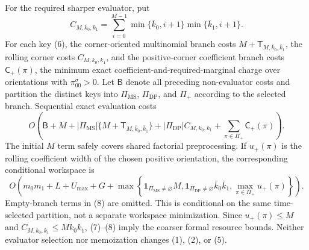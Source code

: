 For the required sharper evaluator, put
\[
C_{M,k_0,k_1}=\sum_{i=0}^{M-1}\min\{\bar k_0,i+1\}\min\{\bar k_1,i+1\}.
\]
For each key (6), the corner-oriented multinomial branch costs \(M+\mathsf T_{M,\bar k_0,\bar k_1}\), the rolling corner costs \(C_{M,k_0,k_1}\), and the positive-corner coefficient branch costs \(\mathsf C_+(\pi)\), the minimum exact coefficient-and-required-marginal charge over orientations with \(\pi^\sigma_{00}>0\). Let \(\mathsf B\) denote all preceding non-evaluator costs and partition the distinct keys into \(\Pi_{\mathrm{MS}}\), \(\Pi_{\mathrm{DP}}\), and \(\Pi_+\) according to the selected branch. Sequential exact evaluation costs
\[
O\!\left(\mathsf B+M+|\Pi_{\mathrm{MS}}|\{M+\mathsf T_{M,\bar k_0,\bar k_1}\}+|\Pi_{\mathrm{DP}}|C_{M,k_0,k_1}+\sum_{\pi\in\Pi_+}\mathsf C_+(\pi)\right).
\tag{7}
\]
The initial \(M\) term safely covers shared factorial preprocessing. If \(u_+(\pi)\) is the rolling coefficient width of the chosen positive orientation, the corresponding conditional workspace is
\[
O\!\left(m_0m_1+L+U_{\max}+G+\max\left\{\mathbf 1_{\Pi_{\mathrm{MS}}\ne\varnothing}M,\mathbf 1_{\Pi_{\mathrm{DP}}\ne\varnothing}\bar k_0\bar k_1,\max_{\pi\in\Pi_+}u_+(\pi)\right\}\right).
\tag{8}
\]
Empty-branch terms in (8) are omitted. This is conditional on the same time-selected partition, not a separate workspace minimization. Since \(u_+(\pi)\le M\) and \(C_{M,k_0,k_1}\le Mk_0k_1\), (7)--(8) imply the coarser formal resource bounds. Neither evaluator selection nor memoization changes (1), (2), or (5).